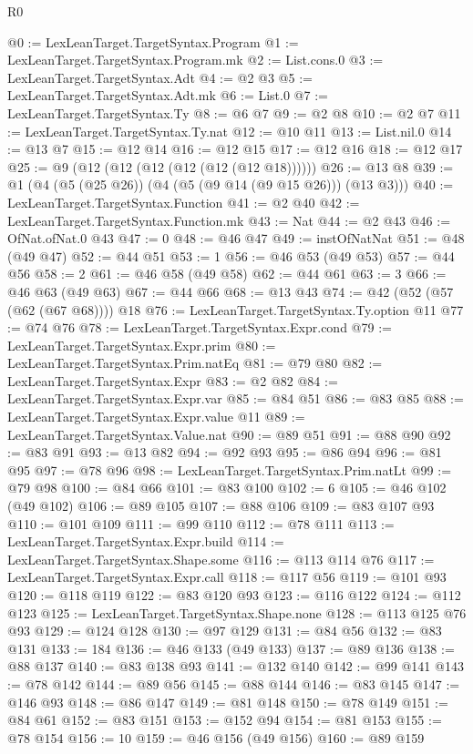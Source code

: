 \begin{lexlean}{R0}
\begin{coremodule}
@0 := LexLeanTarget.TargetSyntax.Program
@1 := LexLeanTarget.TargetSyntax.Program.mk
@2 := List.cons.{0}
@3 := LexLeanTarget.TargetSyntax.Adt
@4 := @2 @3
@5 := LexLeanTarget.TargetSyntax.Adt.mk
@6 := List.{0}
@7 := LexLeanTarget.TargetSyntax.Ty
@8 := @6 @7
@9 := @2 @8
@10 := @2 @7
@11 := LexLeanTarget.TargetSyntax.Ty.nat
@12 := @10 @11
@13 := List.nil.{0}
@14 := @13 @7
@15 := @12 @14
@16 := @12 @15
@17 := @12 @16
@18 := @12 @17
@25 := @9 (@12 (@12 (@12 (@12 (@12 (@12 @18))))))
@26 := @13 @8
@39 := @1 (@4 (@5 (@25 @26)) (@4 (@5 (@9 @14 (@9 @15 @26))) (@13 @3)))
@40 := LexLeanTarget.TargetSyntax.Function
@41 := @2 @40
@42 := LexLeanTarget.TargetSyntax.Function.mk
@43 := Nat
@44 := @2 @43
@46 := OfNat.ofNat.{0} @43
@47 := 0
@48 := @46 @47
@49 := instOfNatNat
@51 := @48 (@49 @47)
@52 := @44 @51
@53 := 1
@56 := @46 @53 (@49 @53)
@57 := @44 @56
@58 := 2
@61 := @46 @58 (@49 @58)
@62 := @44 @61
@63 := 3
@66 := @46 @63 (@49 @63)
@67 := @44 @66
@68 := @13 @43
@74 := @42 (@52 (@57 (@62 (@67 @68)))) @18
@76 := LexLeanTarget.TargetSyntax.Ty.option @11
@77 := @74 @76
@78 := LexLeanTarget.TargetSyntax.Expr.cond
@79 := LexLeanTarget.TargetSyntax.Expr.prim
@80 := LexLeanTarget.TargetSyntax.Prim.natEq
@81 := @79 @80
@82 := LexLeanTarget.TargetSyntax.Expr
@83 := @2 @82
@84 := LexLeanTarget.TargetSyntax.Expr.var
@85 := @84 @51
@86 := @83 @85
@88 := LexLeanTarget.TargetSyntax.Expr.value @11
@89 := LexLeanTarget.TargetSyntax.Value.nat
@90 := @89 @51
@91 := @88 @90
@92 := @83 @91
@93 := @13 @82
@94 := @92 @93
@95 := @86 @94
@96 := @81 @95
@97 := @78 @96
@98 := LexLeanTarget.TargetSyntax.Prim.natLt
@99 := @79 @98
@100 := @84 @66
@101 := @83 @100
@102 := 6
@105 := @46 @102 (@49 @102)
@106 := @89 @105
@107 := @88 @106
@109 := @83 @107 @93
@110 := @101 @109
@111 := @99 @110
@112 := @78 @111
@113 := LexLeanTarget.TargetSyntax.Expr.build
@114 := LexLeanTarget.TargetSyntax.Shape.some
@116 := @113 @114 @76
@117 := LexLeanTarget.TargetSyntax.Expr.call
@118 := @117 @56
@119 := @101 @93
@120 := @118 @119
@122 := @83 @120 @93
@123 := @116 @122
@124 := @112 @123
@125 := LexLeanTarget.TargetSyntax.Shape.none
@128 := @113 @125 @76 @93
@129 := @124 @128
@130 := @97 @129
@131 := @84 @56
@132 := @83 @131
@133 := 184
@136 := @46 @133 (@49 @133)
@137 := @89 @136
@138 := @88 @137
@140 := @83 @138 @93
@141 := @132 @140
@142 := @99 @141
@143 := @78 @142
@144 := @89 @56
@145 := @88 @144
@146 := @83 @145
@147 := @146 @93
@148 := @86 @147
@149 := @81 @148
@150 := @78 @149
@151 := @84 @61
@152 := @83 @151
@153 := @152 @94
@154 := @81 @153
@155 := @78 @154
@156 := 10
@159 := @46 @156 (@49 @156)
@160 := @89 @159

\end{coremodule}
\end{lexlean}
